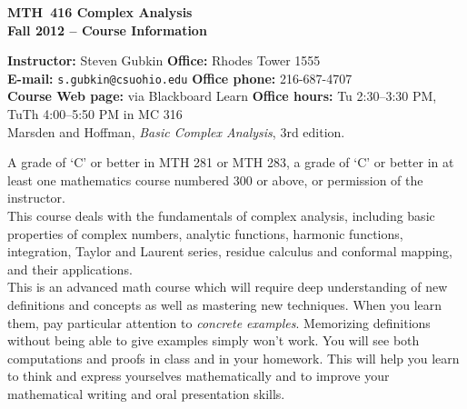 \documentclass[11pt]{article}
\begin{document}
\begin{center}
{\noindent \bf \large MTH~416 Complex Analysis\\
 Fall 2012 -- Course Information\\
}
\end{center}

\medskip

\begin{tabbing}
{\bf Instructor:} Steven Gubkin \hspace{1.5in} \=
{\bf Office:} Rhodes Tower 1555\\ 
{\bf E-mail:} {\tt s.gubkin@csuohio.edu} \>
{\bf Office phone:} 216-687-4707\\ 
{\bf Course Web page:}  via Blackboard Learn  \> 
{\bf Office hours:} Tu 2:30--3:30 PM,\\ 

 TuTh 4:00--5:50 PM in MC 316\\

 Marsden and Hoffman, {\it
	Basic Complex Analysis}, 3rd edition. \\  
\end{tabbing}



 A grade of `C' or better in MTH 281 or MTH 283, a grade of `C' or better in at least one mathematics course numbered 300 or above, or permission of the instructor.\\

 
  This course deals with the fundamentals of complex analysis, including basic properties of complex numbers, analytic functions, harmonic functions, integration, Taylor and Laurent series, residue calculus and conformal mapping, and their applications.\\
 
 This is an advanced math course which will require
deep understanding of new definitions and concepts as well as mastering new techniques. 
When you learn them, pay particular attention to {\it concrete examples}.
Memorizing definitions without being able to give examples simply won't work.
You will see both computations and proofs in class and in your homework.
This will help you learn to think and express yourselves mathematically and 
to improve your mathematical writing and oral presentation skills.\\
\end{document}
